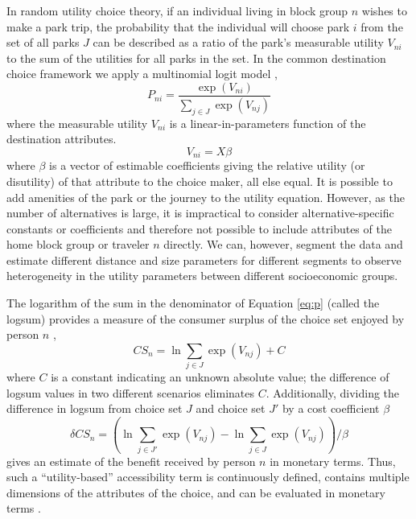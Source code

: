 \documentclass[3p, authoryear, review]{elsarticle} %
\begin{document}
In random utility choice theory, if an individual living in block group \(n\) wishes to make a park trip, the probability that the individual will choose park \(i\) from the set of all parks \(J\) can be described as a ratio of the park's measurable utility \(V_{ni}\) to the sum of the utilities for all parks in the set. In the common destination choice framework we apply a multinomial logit model \citep[\citet{Recker1978}]{McFadden1974},
\begin{equation}\label{eq:p}
   P_{ni} = \frac{\exp(V_{ni})}{\sum_{j \in J}\exp(V_{nj})}
\end{equation}
where the measurable utility \(V_{ni}\) is a linear-in-parameters function of
the destination attributes.
\begin{equation}\label{eq:V}
V_{ni} = X\beta
\end{equation}
where \(\beta\) is a vector of estimable coefficients giving the relative utility (or disutility) of that attribute to the choice maker, all else equal. It is possible to add amenities of the park or the journey to the utility equation. However, as the number of alternatives is large, it is impractical to consider alternative-specific constants or coefficients and therefore not possible to include attributes of the home block group or traveler \(n\) directly. We can, however, segment the data and estimate different distance and size parameters for different segments to observe heterogeneity in the utility parameters between different socioeconomic groups.

The logarithm of the sum in the denominator of Equation \ref{eq:p} (called the logsum) provides a measure of the consumer surplus of the choice set enjoyed by person \(n\) \citep{Williams1977a},
\begin{equation}
CS_n = \ln{{\sum_{j \in J}\exp(V_{nj})}} + C
  \label{eq:logsum}
\end{equation}
where \(C\) is a constant indicating an unknown absolute value; the difference of logsum values in two different scenarios eliminates \(C\). Additionally, dividing the difference in logsum from choice set \(J\) and choice set \(J'\) by a cost coefficient \(\beta\)
\begin{equation}
\delta CS_n = (\ln{\sum_{j \in J'}\exp(V_{nj})} - \ln{\sum_{j \in J}\exp(V_{nj})})/\beta
  \label{eq:deltalogsum}
\end{equation}
gives an estimate of the benefit received by person \(n\) in monetary terms. Thus, such a ``utility-based'' accessibility term is continuously defined, contains multiple dimensions of the attributes of the choice, and can be evaluated in monetary terms \citep{Handy1997, Dong2006}.
\end{document}

